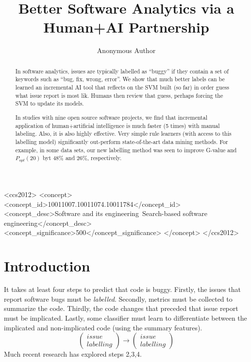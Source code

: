 \documentclass[sigconf,review, anonymous]{acmart}
\title{Better Software Analytics via a Human+AI Partnership}
\author{Anonymous Author}
\begin{document}
 
\begin{abstract}


In software analytics, issues are typically labelled as ``buggy'' if they
contain a  set of keywords such as ``bug, fix, wrong, error''.
We show that much better labels can be learned  an incremental
AI tool that
reflects on the SVM built (so far) in order  guess what issue report is most lik. Humans then review that guess, perhaps forcing the SVM
to update its models. 

In studies with nine open source software projects, we find that
incremental application of human+artificial  intelligence
is much faster (5 times)     with manual labeling.
Also,  it is also highly effective.
Very simple rule learners (with
access to this labelling model) significantly out-perform
state-of-the-art data mining methods.  For example, in some data sets,
our new labelling method was seen to improve 
G-value and $P_{opt}(20)$ byt 48\% and 26\%, respectively. 




\end{abstract}
 
\begin{CCSXML}
<ccs2012>
<concept>
<concept_id>10011007.10011074.10011784</concept_id>
<concept_desc>Software and its engineering~Search-based software engineering</concept_desc>
<concept_significance>500</concept_significance>
</concept>
</ccs2012>
\end{CCSXML}

 

\maketitle
\section{Introduction}

It takes at least four steps
to predict   that code is buggy.
Firstly,
 the issues  that report software bugs must
 be {\em labelled}.  
Secondly, metrics  must be collected to summarize
the code.
Thirdly, the code changes that preceded that issue report
must be implicated. Lastly, some classifier
must learn to differentiate between the implicated and
non-implicated code (using the summary features). 
\[
\left(\begin{array}{c}
issue\\
labelling
\end{array}\right)\rightarrow
\left(\begin{array}{c}
issue\\
labelling
\end{array}\right)
\]
Much recent research has explored
steps 2,3,4. 
\end{document}
